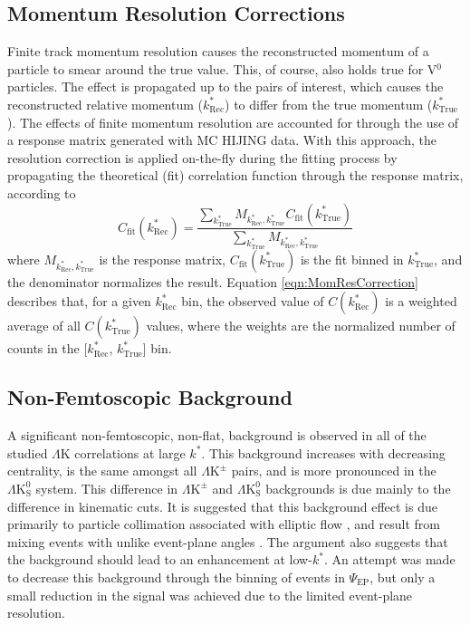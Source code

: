 \documentclass[ALICE,manyauthors]{cernphprep}
\newcommand{\kstar}{$k^{*}$\xspace}
\newcommand{\ktrue}{$k^{*}_{\mathrm{True}}$\xspace}
\newcommand{\krec}{$k^{*}_{\mathrm{Rec}}$\xspace}
\newcommand{\LamK}{$\Lambda$K\xspace}
\newcommand{\LamKpm}{$\Lambda\mathrm{K^{\pm}}$\xspace}
\newcommand{\LamKs}{$\Lambda\mathrm{K^{0}_{S}}$\xspace}
\newcommand{\Vz}{V$^{0}$\xspace}
\begin{document}
\subsection{Momentum Resolution Corrections}
\label{MomentumResolutionCorrections}

Finite track momentum resolution causes the reconstructed momentum of a particle to smear around the true value.
This, of course, also holds true for \Vz particles.
The effect is propagated up to the pairs of interest, which causes the reconstructed relative momentum (\krec) to differ from the true momentum (\ktrue).
The effects of finite momentum resolution are accounted for through the use of a response matrix generated with MC HIJING data.
With this approach, the resolution correction is applied on-the-fly during the fitting process by propagating the theoretical (fit) correlation function through the response matrix, according to
\begin{equation}
  C_{\mathrm{fit}}(k^{*}_{\mathrm{Rec}}) = \dfrac{\sum\limits_{k^{*}_{\mathrm{True}}}M_{k^{*}_{\mathrm{Rec}},k^{*}_{\mathrm{True}}}C_{\mathrm{fit}}(k^{*}_{\mathrm{True}})}{\sum\limits_{k^{*}_{\mathrm{True}}}M_{k^{*}_{\mathrm{Rec}},k^{*}_{\mathrm{True}}}}
\label{eqn:MomResCorrection}
\end{equation}
where $M_{k^{*}_{\mathrm{Rec}},k^{*}_{\mathrm{True}}}$ is the response matrix, $C_{\mathrm{fit}}(k^{*}_{\mathrm{True}})$ is the fit binned in \ktrue, and the denominator normalizes the result.
Equation \ref{eqn:MomResCorrection} describes that, for a given \krec bin, the observed value of $C(k^{*}_{\mathrm{Rec}})$ is a weighted average of all $C(k^{*}_{\mathrm{True}})$ values, where the weights are the normalized number of counts in the [\krec, \ktrue] bin.



\subsection{Non-Femtoscopic Background}
\label{NonFlatBackground}

A significant non-femtoscopic, non-flat, background is observed in all of the studied \LamK correlations at large \kstar.  
This background increases with decreasing centrality, is the same amongst all \LamKpm pairs, and is more pronounced in the \LamKs system.
This difference in \LamKpm and \LamKs backgrounds is due mainly to the difference in kinematic cuts.  
It is suggested that this background effect is due primarily to particle collimation associated with elliptic flow , and result from mixing events with unlike event-plane angles \cite{Kisiel:2017}.  
The argument also suggests that the background should lead to an enhancement at low-\kstar. 
An attempt was made to decrease this background through the binning of events in $\Psi_{\mathrm{EP}}$, but only a small reduction in the signal was achieved due to the limited event-plane resolution.
\end{document}
